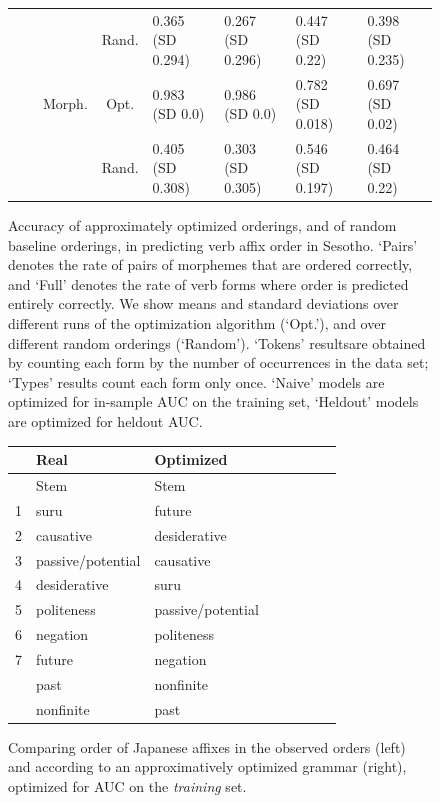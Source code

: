 \documentclass[11pt,letterpaper]{article}
\begin{document}
\begin{figure}
\begin{tabular}{cccc||ll|ll}
     &         &         &   Rand.  &  0.365 (SD 0.294) & 0.267 (SD 0.296) & 0.447 (SD 0.22) & 0.398 (SD 0.235) \\
     &         &Morph.  &   Opt.  &  0.983 (SD 0.0) & 0.986 (SD 0.0) & 0.782 (SD 0.018) & 0.697 (SD 0.02) \\
     &         &           &   Rand.  &  0.405 (SD 0.308) & 0.303 (SD 0.305) & 0.546 (SD 0.197) & 0.464 (SD 0.22) \\
\end{tabular}
\caption{Accuracy of approximately optimized orderings, and of random baseline orderings, in predicting verb affix order in Sesotho. `Pairs' denotes the rate of pairs of morphemes that are ordered correctly, and `Full' denotes the rate of verb forms where order is predicted entirely correctly. We show means and standard deviations over different runs of the optimization algorithm (`Opt.'), and over different random orderings (`Random'). `Tokens' resultsare obtained by counting each form by the number of occurrences in the data set; `Types' results count each form only once. `Naive' models are optimized for in-sample AUC on the training set, `Heldout' models are optimized for heldout AUC.}\label{fig:acc-sesotho}
\end{figure}



\begin{figure} %
    \centering
    \begin{tabular}{llllllll}
            &       Real & Optimized \\ \hline\hline
            &    Stem & Stem \\ \hline
1 & suru & future \\
2 & causative & desiderative \\
3 & passive/potential & causative \\
4 & desiderative & suru \\
5 & politeness & passive/potential \\
6 & negation & politeness \\
7 & future & negation \\
 & past & nonfinite \\
 & nonfinite & past \\ \hline
    \end{tabular}
	\caption{Comparing order of Japanese affixes in the observed orders (left) and according to an approximatively optimized grammar (right), optimized for AUC on the \emph{training} set.}
    \label{fig:grammar-table-jap}
\end{figure}
\end{document}
